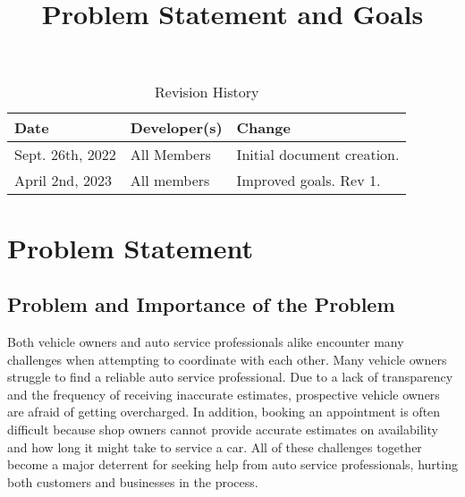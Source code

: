 \documentclass{article}
\date{}
\begin{document}
\title{Problem Statement and Goals\\\progname}

\author{\authname}

\begin{table}[hp]
\caption{Revision History} \label{TblRevisionHistory}
\begin{tabularx}{\textwidth}{llX}
\toprule
\textbf{Date} & \textbf{Developer(s)} & \textbf{Change}\\
\midrule
Sept. 26th, 2022  & All Members & Initial document creation. \\
April 2nd, 2023 & All members & Improved goals. Rev 1.\\
\bottomrule
\end{tabularx}
\end{table}
    
\newpage

\maketitle

\section{Problem Statement}


\subsection{Problem and Importance of the Problem}

Both vehicle owners and auto service professionals alike encounter many challenges when attempting to coordinate with each other. Many vehicle owners struggle to find a reliable auto service professional. Due to a lack of transparency and the frequency of receiving inaccurate estimates, prospective vehicle owners are afraid of getting overcharged. In addition, booking an appointment is often difficult because shop owners cannot provide accurate estimates on availability and how long it might take to service a car. All of these challenges together become a major deterrent for seeking help from auto service professionals, hurting both customers and businesses in the process.
\end{document}

